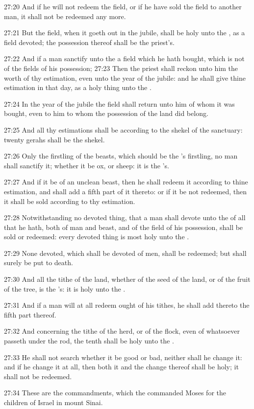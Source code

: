 27:20 And if he will not redeem the field, or if he have sold the field to another man, it shall not be redeemed any more.

27:21 But the field, when it goeth out in the jubile, shall be holy unto the \LORD, as a field devoted; the possession thereof shall be the priest's.

27:22 And if a man sanctify unto the \LORD a field which he hath bought, which is not of the fields of his possession; 27:23 Then the priest shall reckon unto him the worth of thy estimation, even unto the year of the jubile: and he shall give thine estimation in that day, as a holy thing unto the \LORD.

27:24 In the year of the jubile the field shall return unto him of whom it was bought, even to him to whom the possession of the land did belong.

27:25 And all thy estimations shall be according to the shekel of the sanctuary: twenty gerahs shall be the shekel.

27:26 Only the firstling of the beasts, which should be the \LORD's firstling, no man shall sanctify it; whether it be ox, or sheep: it is the \LORD's.

27:27 And if it be of an unclean beast, then he shall redeem it according to thine estimation, and shall add a fifth part of it thereto: or if it be not redeemed, then it shall be sold according to thy estimation.

27:28 Notwithstanding no devoted thing, that a man shall devote unto the \LORD of all that he hath, both of man and beast, and of the field of his possession, shall be sold or redeemed: every devoted thing is most holy unto the \LORD.

27:29 None devoted, which shall be devoted of men, shall be redeemed; but shall surely be put to death.

27:30 And all the tithe of the land, whether of the seed of the land, or of the fruit of the tree, is the \LORD's: it is holy unto the \LORD.

27:31 And if a man will at all redeem ought of his tithes, he shall add thereto the fifth part thereof.

27:32 And concerning the tithe of the herd, or of the flock, even of whatsoever passeth under the rod, the tenth shall be holy unto the \LORD.

27:33 He shall not search whether it be good or bad, neither shall he change it: and if he change it at all, then both it and the change thereof shall be holy; it shall not be redeemed.

27:34 These are the commandments, which the \LORD commanded Moses for the children of Israel in mount Sinai.

